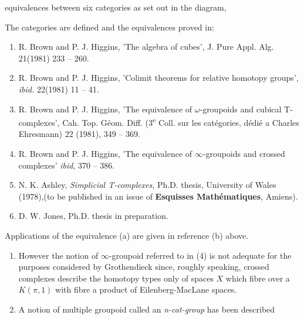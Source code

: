 \documentclass[11pt,a4paper]{article}
\begin{document}
equivalences between six categories as set out in the diagram,



The categories are defined and the equivalences proved in:

\begin{enumerate}
  \item[a)] R. Brown and P. J. Higgins, 'The algebra of cubes', J. Pure Appl. Alg. 21(1981) 233 -- 260.
  \item[b)] R. Brown and P. J. Higgins, 'Colimit theorems for relative homotopy groups', \emph{ibid.} 22(1981) 11 -- 41.
  \item[c)] R. Brown and P. J. Higgins, 'The equivalence of $\omega$-groupoids and cubical T-complexes', Cah. Top. Géom. Diff. (3\textsuperscript{e} Coll. sur les catégories, dédié a Charles Ehresmann) 22 (1981), 349 -- 369.
  \item[d)] R. Brown and P. J. Higgins, 'The equivalence of $\infty$-groupoids and crossed complexes' \emph{ibid}, 370 -- 386.
  \item[e)] N. K. Ashley, \emph{Simplicial T-complexes}, Ph.D. thesis, University of Wales (1978),(to be published in an issue of \textbf{Esquisses Mathématiques}, Amiens).
  \item[f)] D. W. Jones, Ph.D. thesis in preparation.
\end{enumerate}

Applications of the equivalence (a) are given in reference (b) above.

\begin{enumerate}
  \item[5.] However the notion of $\infty$-groupoid referred to in (4) is not adequate for the purposes considered by Grothendieck since, roughly speaking, crossed complexes describe the homotopy types only of spaces $X$ which fibre over a $K(\pi,1)$ with fibre a product of Eilenberg-MacLane spaces.
  \item[6.] A notion of multiple groupoid called an \emph{n-cat-group} has been described
\end{enumerate}
\end{document}

